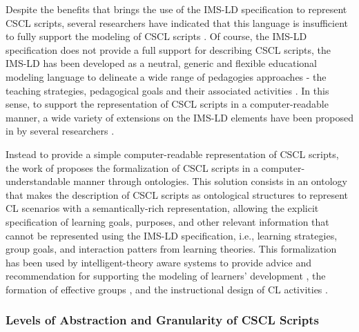 Despite the benefits that brings the use of the IMS-LD specification to represent CSCL scripts, several researchers have indicated that this language is insufficient to fully support the modeling of CSCL scripts \cite{AlharbiAthaudaChiong2014, CaeiroAnidoLlamas2003}.
Of course, the IMS-LD specification does not provide a full support for describing CSCL scripts, the IMS-LD has been developed as a neutral, generic and flexible educational modeling language to delineate a wide range of pedagogies approaches - the teaching strategies, pedagogical goals and their associated activities \cite{Koper2005}.
In this sense, to support the representation of CSCL scripts in a computer-readable manner, a wide variety of extensions on the IMS-LD elements have been proposed in by several researchers \cite{Bote-LorenzoVaquero-GonzalezVega-GorgojoDimitriadisAsensio-PerezGomez-SanchezHernandez-Leo2004, LeoPerezDimitriadis2004, MagnisalisDemetriadis2012, MiaoHoeksemaHoppeHarrer2005, Vega-GorgojoBote-LorenzoGomez-SanchezDimitriadisAsensio-Perez2005}.

Instead to provide a simple computer-readable representation of CSCL scripts, the work of  proposes the formalization of CSCL scripts in a computer-understandable manner through ontologies.
This solution consists in an ontology that makes the description of CSCL scripts as ontological structures to represent CL scenarios with a semantically-rich representation, allowing the explicit specification of learning goals, purposes, and other relevant information that cannot be represented using the IMS-LD specification, i.e., learning strategies, group goals, and interaction patters from learning theories.
This formalization has been used by intelligent-theory aware systems to provide advice and recommendation for supporting the modeling of learners' development \cite{InabaIkedaMizoguchi2003}, the formation of effective groups \cite{IsotaniMizoguchi2008a}, and the instructional design of CL activities \cite{IsotaniMizoguchiIsotaniCapeliIsotanideAlbuquerqueBittencourtJaques2013}.

\subsubsection{Levels of Abstraction and Granularity of CSCL Scripts}
\label{sec:level-of-abstraction-and-granularity-of-cscl-scripts}

